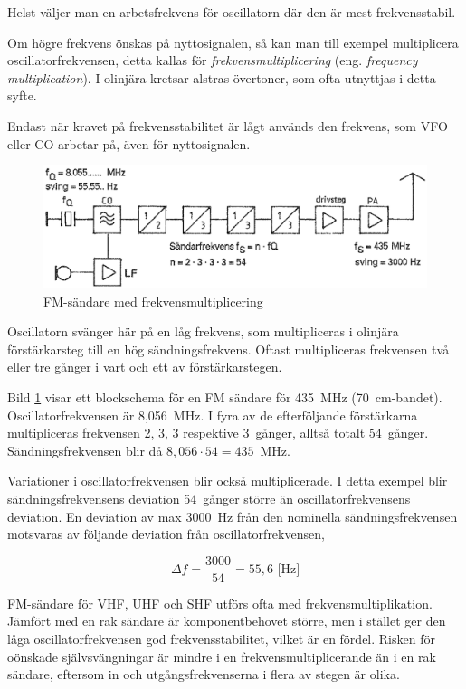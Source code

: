 Helst väljer man en arbetsfrekvens för oscillatorn där den är mest
frekvensstabil.

Om högre frekvens önskas på nyttosignalen, så kan man
till exempel multiplicera oscillatorfrekvensen, detta kallas för
\emph{frekvensmultiplicering} (eng. \emph{frequency multiplication}).
I olinjära kretsar alstras övertoner, som ofta utnyttjas i detta syfte.

Endast när kravet på frekvensstabilitet är lågt används den frekvens,
som VFO eller CO arbetar på, även för nyttosignalen.

\begin{figure}
  \includegraphics[width=\textwidth]{images/cropped_pdfs/bild_2_5-03.pdf}
  \caption{FM-sändare med frekvensmultiplicering}
  \label{fig:bildII5-3}
\end{figure}

Oscillatorn svänger här på en låg frekvens, som multipliceras i
olinjära förstärkarsteg till en hög sändningsfrekvens.
Oftast multipliceras frekvensen två eller tre gånger i vart och ett av
förstärkarstegen.

Bild \ref{fig:bildII5-3} visar ett blockschema för en FM sändare för
435~MHz (70~cm-bandet).
Oscillatorfrekvensen är 8,056~MHz.
I fyra av de efterföljande förstärkarna multipliceras frekvensen 2, 3, 3
respektive 3~gånger, alltså totalt 54~gånger.
Sändningsfrekvensen blir då \(8,056 \cdot 54 = 435\)~MHz.

Variationer i oscillatorfrekvensen blir också multiplicerade.
I detta exempel blir sändningsfrekvensens deviation 54~gånger större än
oscillatorfrekvensens deviation.
En deviation av max 3000~Hz från den nominella sändningsfrekvensen motsvaras
av följande deviation från oscillatorfrekvensen,

\[\Delta f = \frac{3000}{54} = 55,6\text{ [Hz]}\]

FM-sändare för VHF, UHF och SHF utförs ofta med
frekvensmultiplikation.
Jämfört med en rak sändare är komponentbehovet större, men i stället ger
den låga oscillatorfrekvensen god frekvensstabilitet, vilket är en fördel.
Risken för oönskade självsvängningar är mindre i en frekvensmultiplicerande
än i en rak sändare, eftersom in och utgångsfrekvenserna i flera av stegen är
olika.

